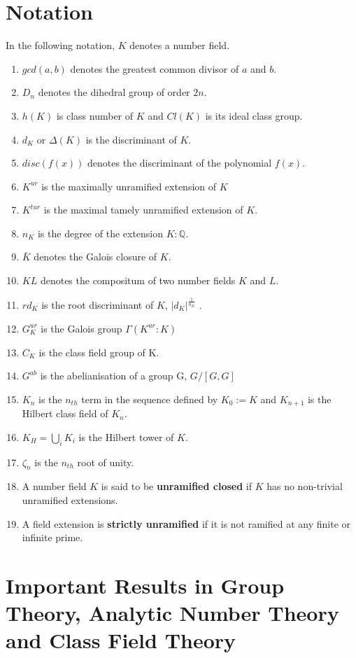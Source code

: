 \documentclass[12pt]{extarticle}
\newcommand{\Q}{\mathbb{Q}}
\newcommand{\<}{\langle}
\renewcommand{\>}{\rangle}
\theoremstyle{definition}
\begin{document}
\section{Notation}
In the following notation, $K$ denotes a number field.
\begin{enumerate}
    \item $gcd(a,b)$ denotes the greatest common divisor of $a$ and $b$.
    \item $D_n$ denotes the dihedral group of order $2n$. 
    \item $h(K)$ is class number of $K$ and $Cl(K)$ is its ideal class group.
    \item $d_K$ or $\Delta(K)$ is the discriminant of $K$.
    \item $disc(f(x))$ denotes the discriminant of the polynomial $f(x)$.
    \item $K^{ur}$ is the maximally unramified extension of $K$
    \item $K^{tur}$ is the maximal tamely unramified extension of $K$.
    \item $n_K$ is the degree of the extension $K:\Q$.
    \item $\bar{K}$ denotes the Galois closure of $K$.
    \item $KL$ denotes the compositum of two number fields $K$ and $L$.
    \item $rd_K$ is the root discriminant of $K$, $|d_K|^\frac{1}{n_K}$ .
    \item $G_K^{ur}$ is the Galois group $\Gamma(K^{ur}:K)$
    \item $C_K$ is the class field group of K. 
    \item $G^{ab}$ is the abelianisation of a group G, $G/[G,G]$
    \item $K_n$ is the $n_{th}$ term in the sequence defined by $K_0:=K$ and $K_{n+1}$ is the Hilbert class field of $K_n$.
    \item $K_H=\bigcup_{i}K_{i}$ is the Hilbert tower of $K$.  
    \item $\zeta_n$ is the $n_{th}$ root of unity. 
    \item A number field $K$ is said to be \textbf{unramified closed} if $K$ has no non-trivial unramified extensions. 
    \item A field extension is \textbf{strictly unramified} if it is not ramified at any finite or infinite prime.

\end{enumerate}

\section{Important Results in Group Theory, Analytic Number Theory and Class Field Theory}
\end{document}
